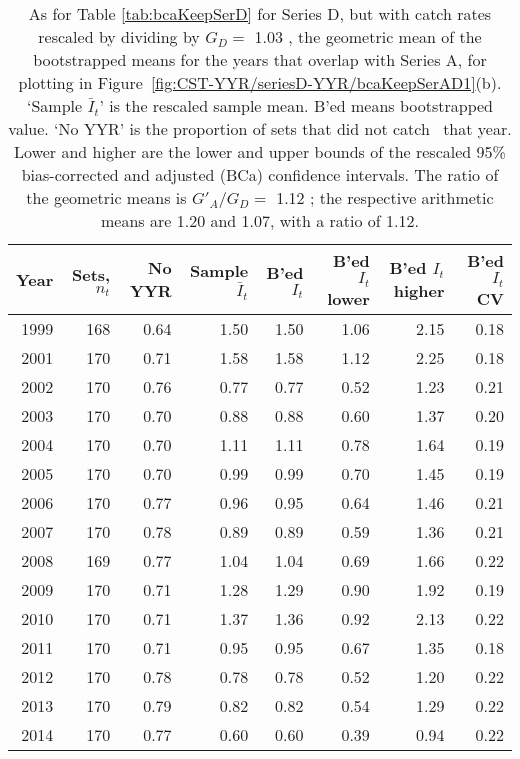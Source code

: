 \begin{table}[tp]
\centering
\caption{As for Table \ref{tab:bcaKeepSerD} for Series D, 
     but with catch rates rescaled by dividing
     by $G_{D}=$ 1.03 , 
     the geometric mean of the bootstrapped means for the years that overlap
     with Series A, for plotting in 
     Figure~\ref{fig:CST-YYR/seriesD-YYR/bcaKeepSerAD1}(b).
     `Sample $\bar{I}_t$' is the rescaled sample mean. B'ed means bootstrapped 
     value. `No YYR' is the proportion of sets that did not catch \spName~that
     year. Lower and higher are the 
     lower and upper bounds of the rescaled 
     95\% bias-corrected and adjusted (BCa)
     confidence intervals. The ratio of the geometric means is
     $G'_{A}/G_{D}=$ 1.12 ; the respective arithmetic means 
     are 1.20 and 1.07, with a ratio of  1.12.} 
\label{tab:serDscaled}
\begin{tabular}{rrrrrrrr}
  \hline
Year & Sets, $n_t$ & No YYR & Sample $\bar{I}_t$ & B'ed $I_t$ & B'ed $I_t$ lower & B'ed $I_t$ higher & B'ed $I_t$ CV \\ 
  \hline
1999 & 168 & 0.64 & 1.50 & 1.50 & 1.06 & 2.15 & 0.18 \\ 
  2001 & 170 & 0.71 & 1.58 & 1.58 & 1.12 & 2.25 & 0.18 \\ 
  2002 & 170 & 0.76 & 0.77 & 0.77 & 0.52 & 1.23 & 0.21 \\ 
  2003 & 170 & 0.70 & 0.88 & 0.88 & 0.60 & 1.37 & 0.20 \\ 
  2004 & 170 & 0.70 & 1.11 & 1.11 & 0.78 & 1.64 & 0.19 \\ 
  2005 & 170 & 0.70 & 0.99 & 0.99 & 0.70 & 1.45 & 0.19 \\ 
  2006 & 170 & 0.77 & 0.96 & 0.95 & 0.64 & 1.46 & 0.21 \\ 
  2007 & 170 & 0.78 & 0.89 & 0.89 & 0.59 & 1.36 & 0.21 \\ 
  2008 & 169 & 0.77 & 1.04 & 1.04 & 0.69 & 1.66 & 0.22 \\ 
  2009 & 170 & 0.71 & 1.28 & 1.29 & 0.90 & 1.92 & 0.19 \\ 
  2010 & 170 & 0.71 & 1.37 & 1.36 & 0.92 & 2.13 & 0.22 \\ 
  2011 & 170 & 0.71 & 0.95 & 0.95 & 0.67 & 1.35 & 0.18 \\ 
  2012 & 170 & 0.78 & 0.78 & 0.78 & 0.52 & 1.20 & 0.22 \\ 
  2013 & 170 & 0.79 & 0.82 & 0.82 & 0.54 & 1.29 & 0.22 \\ 
  2014 & 170 & 0.77 & 0.60 & 0.60 & 0.39 & 0.94 & 0.22 \\ 
   \hline
\end{tabular}
\end{table}

